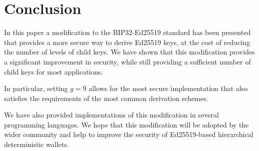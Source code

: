 \documentclass[12pt, a4paper, twocolumn]{article}
\begin{document}
\section{Conclusion}

In this paper a modification to the BIP32-Ed25519 standard has been presented that provides a more secure way to derive Ed25519 keys, at the cost of reducing the number of levels of child keys. We have shown that this modification provides a significant improvement in security, while still providing a sufficient number of child keys for most applications.

In particular, setting $g=9$ allows for the most secure implementation that also satisfies the requirements of the most common derivation schemes.

We have also provided implementations of this modification in several programming languages. We hope that this modification will be adopted by the wider community and help to improve the security of Ed25519-based hierarchical deterministic wallets.


\nocite{*}


\end{document}
